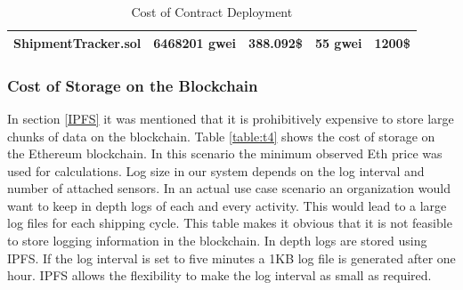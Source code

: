 \begin{table}[h]
{\begin{tabular}{|l|l|l|l|c|}
ShipmentTracker.sol                                                           & 6468201 gwei                                                                           & 388.092\$                                                                                    & \multirow{-2}{*}{55 gwei}                                                              & \multirow{-2}{*}{1200\$}                       \\ \hline
\end{tabular}%
}
\caption {Cost of Contract Deployment}
\label{table:t3}
\end{table}

\clearpage
\subsubsection{Cost of Storage on the Blockchain}
In section \ref{IPFS} it was mentioned that it is prohibitively expensive to store large chunks of data on the blockchain. Table \ref{table:t4} shows the cost of storage on the Ethereum blockchain. In this scenario the minimum observed Eth price was used for calculations. Log size in our system depends on the log interval and number of attached sensors. In an actual use case scenario an organization would want to keep in depth logs of each and every activity. This would lead to a large log files for each shipping cycle.  This table makes it obvious that it is not feasible to store logging information in the blockchain. In depth logs are stored using IPFS. If the log interval is set to five minutes a 1KB log file is generated after one hour. IPFS allows the flexibility to make the log interval as small as required. 
\vspace{1mm}
